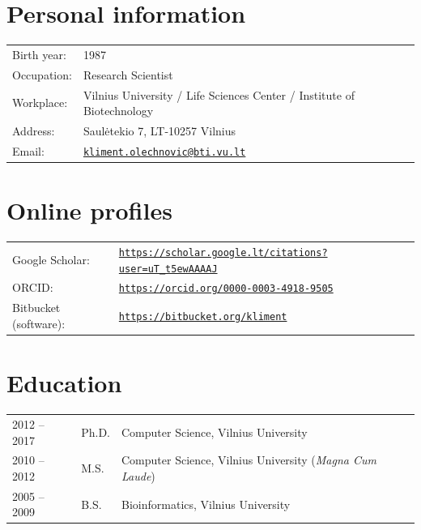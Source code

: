 \documentclass{article}
\begin{document}
\section*{Personal information}
\begin{tabular}{p{}p{}}
Birth year:          & 1987 \\
Occupation:          & Research Scientist \\
Workplace:           & Vilnius University / Life Sciences Center / Institute of Biotechnology \\
Address:             & Saulėtekio 7, LT-10257 Vilnius \\
Email:               & \href{mailto:kliment.olechnovic@bti.vu.lt}{\tt kliment.olechnovic@bti.vu.lt} \\
\end{tabular}


\section*{Online profiles}
\begin{tabular}{p{}p{}}
Google Scholar:             & \href{https://scholar.google.lt/citations?user=uT_t5ewAAAAJ}{\tt https://scholar.google.lt/citations?user=uT\_t5ewAAAAJ} \\
ORCID:                      & \href{https://orcid.org/0000-0003-4918-9505}{\tt https://orcid.org/0000-0003-4918-9505} \\
Bitbucket (software):       & \href{https://bitbucket.org/kliment}{\tt https://bitbucket.org/kliment} \\
\end{tabular}


\section*{Education}
\begin{tabular}{p{}p{}p{}}
2012 -- 2017 & Ph.D. & Computer Science, Vilnius University \\
2010 -- 2012 & M.S.  & Computer Science, Vilnius University (\emph{Magna Cum Laude}) \\
2005 -- 2009 & B.S.  & Bioinformatics, Vilnius University
\end{tabular}
\end{document}
